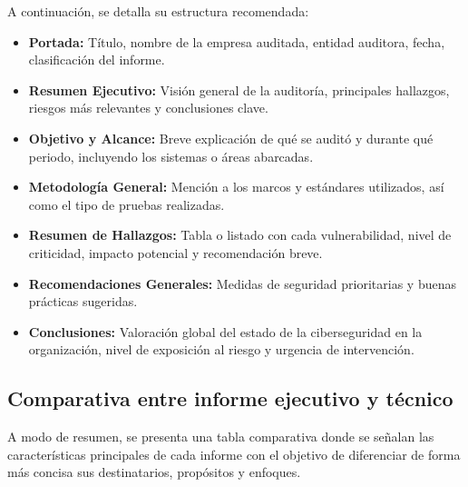 \documentclass[a4paper, 11pt]{article}
\begin{document}
A continuación, se detalla su estructura recomendada:

\begin{itemize}
  \item \textbf{Portada:} Título, nombre de la empresa auditada, entidad auditora, fecha, clasificación del informe.
  \item \textbf{Resumen Ejecutivo:} Visión general de la auditoría, principales hallazgos, riesgos más relevantes y conclusiones clave.
  \item \textbf{Objetivo y Alcance:} Breve explicación de qué se auditó y durante qué periodo, incluyendo los sistemas o áreas abarcadas.
  \item \textbf{Metodología General:} Mención a los marcos y estándares utilizados, así como el tipo de pruebas realizadas.
  \item \textbf{Resumen de Hallazgos:} Tabla o listado con cada vulnerabilidad, nivel de criticidad, impacto potencial y recomendación breve.
  \item \textbf{Recomendaciones Generales:} Medidas de seguridad prioritarias y buenas prácticas sugeridas.
  \item \textbf{Conclusiones:} Valoración global del estado de la ciberseguridad en la organización, nivel de exposición al riesgo y urgencia de intervención.
\end{itemize}





\subsection*{Comparativa entre informe ejecutivo y técnico}


A modo de resumen, se presenta una tabla comparativa donde se señalan las características principales de cada informe con el objetivo de diferenciar de forma más concisa sus destinatarios, propósitos y enfoques.
\end{document}
